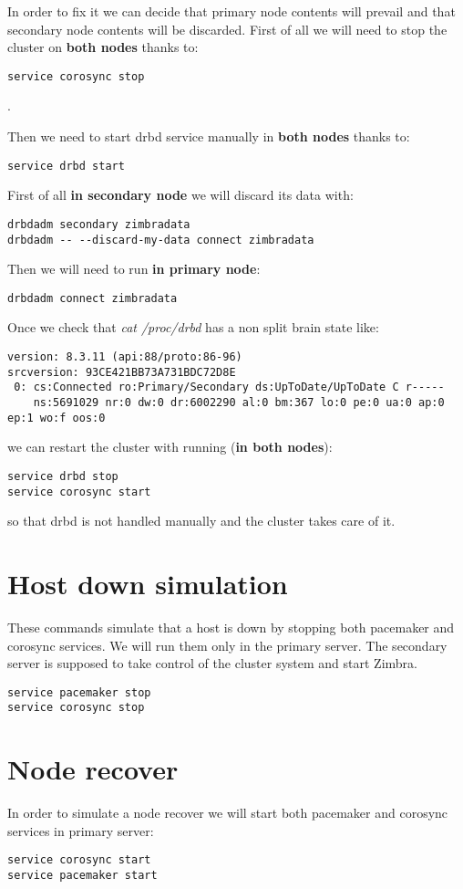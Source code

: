 In order to fix it we can decide that primary node contents will prevail and that secondary node contents will be discarded. First of all we will need to stop the cluster on \textbf{both nodes} thanks to:
\begin{verbatim}
service corosync stop
\end{verbatim}
.

Then we need to start drbd service manually in \textbf{both nodes} thanks to:
\begin{verbatim}
service drbd start
\end{verbatim}

First of all \textbf{in secondary node} we will discard its data with:
\begin{verbatim}
drbdadm secondary zimbradata
drbdadm -- --discard-my-data connect zimbradata
\end{verbatim}
Then we will need to run \textbf{in primary node}:
\begin{verbatim}
drbdadm connect zimbradata
\end{verbatim}

Once we check that \textit{cat /proc/drbd} has a non split brain state like:
\begin{verbatim}
version: 8.3.11 (api:88/proto:86-96)
srcversion: 93CE421BB73A731BDC72D8E 
 0: cs:Connected ro:Primary/Secondary ds:UpToDate/UpToDate C r-----
    ns:5691029 nr:0 dw:0 dr:6002290 al:0 bm:367 lo:0 pe:0 ua:0 ap:0 ep:1 wo:f oos:0
\end{verbatim}
we can restart the cluster with running (\textbf{in both nodes}):
\begin{verbatim}
service drbd stop
service corosync start
\end{verbatim}
so that drbd is not handled manually and the cluster takes care of it.

\section {Host down simulation}
These commands simulate that a host is down by stopping both pacemaker and corosync services. We will run them only in the primary server. The secondary server is supposed to take control of the cluster system and start Zimbra.

\begin{verbatim}
service pacemaker stop
service corosync stop
\end{verbatim}

\section {Node recover}
In order to simulate a node recover we will start both pacemaker and corosync services in primary server:
\begin{verbatim}
service corosync start
service pacemaker start
\end{verbatim}

